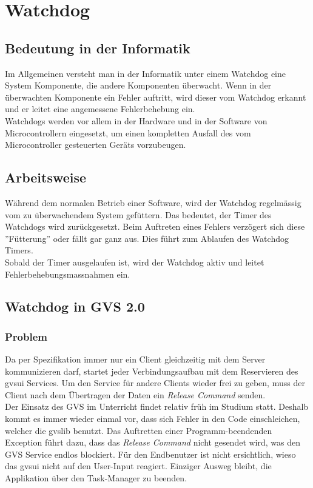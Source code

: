 \documentclass[11pt,a4paper,english,oneside]{book}
\numberwithin{equation}{chapter}
\begin{document}
	\section{Watchdog} \label{sec:watchdog}
	\subsection{Bedeutung in der Informatik}
	Im  Allgemeinen versteht man in der Informatik unter einem Watchdog eine System Komponente, die andere Komponenten überwacht. Wenn in der überwachten Komponente ein Fehler auftritt, wird dieser vom Watchdog erkannt und er leitet eine angemessene Fehlerbehebung ein.\\
	Watchdogs werden vor allem in der Hardware und in der Software von Microcontrollern eingesetzt, um einen kompletten Ausfall des vom Microcontroller gesteuerten Geräts vorzubeugen.\\
	
	\subsection{Arbeitsweise}
	Während dem normalen Betrieb einer Software, wird der Watchdog regelmässig vom zu überwachendem System gefüttern. Das bedeutet, der Timer des Watchdogs wird zurückgesetzt. Beim Auftreten eines Fehlers verzögert sich diese ''Fütterung'' oder fällt gar ganz aus. Dies führt zum Ablaufen des Watchdog Timers. \\
	Sobald der Timer ausgelaufen ist, wird der Watchdog aktiv und leitet Fehlerbehebungsmassnahmen ein.
	
	\subsection{Watchdog in GVS 2.0}
	\subsubsection{Problem}
	Da per Spezifikation immer nur ein Client gleichzeitig mit dem Server kommunizieren darf, startet jeder Verbindungsaufbau mit dem Reservieren des \gls{gvsui} Services. Um den Service für andere Clients wieder frei zu geben, muss der Client nach dem Übertragen der Daten ein \textit{Release Command} senden.\\
	Der Einsatz des GVS im Unterricht findet relativ früh im Studium statt. Deshalb kommt es immer wieder einmal vor, dass sich Fehler in den Code einschleichen, welcher die \gls{gvslib} benutzt. Das Auftretten einer Programm-beendenden Exception führt dazu, dass das \textit{Release Command} nicht gesendet wird, was den GVS Service endlos blockiert. Für den Endbenutzer ist nicht ersichtlich, wieso das \gls{gvsui} nicht auf den User-Input reagiert. Einziger Ausweg bleibt, die Applikation über den Task-Manager zu beenden.
	
\end{document}
